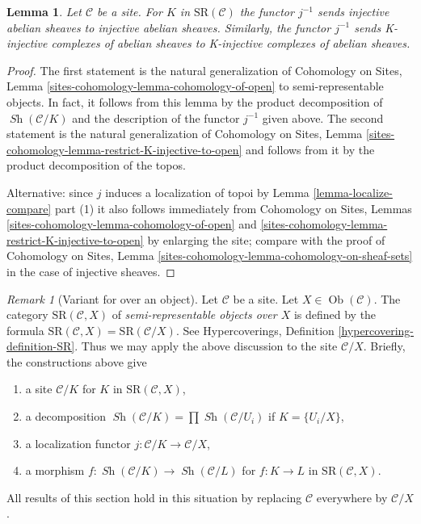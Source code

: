 \documentclass{stacks-project}
\theoremstyle{plain}
\newtheorem{lemma}[subsection]{Lemma}
\theoremstyle{definition}
\theoremstyle{remark}
\newtheorem{remark}[subsection]{Remark}
\numberwithin{equation}{subsection}
\def\Ob{\mathop{\mathrm{Ob}}\nolimits}
\def\Sh{\mathop{\mathit{Sh}}\nolimits}
\begin{document}
\begin{lemma}
\label{lemma-localize-injective}
Let $\mathcal{C}$ be a site. For $K$ in $\text{SR}(\mathcal{C})$
the functor $j^{-1}$ sends injective abelian sheaves to injective
abelian sheaves. Similarly, the functor $j^{-1}$ sends K-injective
complexes of abelian sheaves to K-injective complexes of
abelian sheaves.
\end{lemma}

\begin{proof}
The first statement is the natural generalization of
Cohomology on Sites, Lemma
\ref{sites-cohomology-lemma-cohomology-of-open}
to semi-representable objects.
In fact, it follows from this lemma
by the product decomposition of $\Sh(\mathcal{C}/K)$
and the description of the functor $j^{-1}$ given above.
The second statement is the natural generalization of
Cohomology on Sites, Lemma
\ref{sites-cohomology-lemma-restrict-K-injective-to-open}
and follows from it by the product decomposition of the topos.

\medskip\noindent
Alternative: since $j$ induces a localization of topoi by
Lemma \ref{lemma-localize-compare} part (1)
it also follows immediately from
Cohomology on Sites, Lemmas \ref{sites-cohomology-lemma-cohomology-of-open}
and \ref{sites-cohomology-lemma-restrict-K-injective-to-open}
by enlarging the site; compare with the proof of
Cohomology on Sites, Lemma
\ref{sites-cohomology-lemma-cohomology-on-sheaf-sets}
in the case of injective sheaves.
\end{proof}

\begin{remark}[Variant for over an object]
\label{remark-semi-representable-over-object}
Let $\mathcal{C}$ be a site. Let $X \in \Ob(\mathcal{C})$.
The category $\text{SR}(\mathcal{C}, X)$
of {\it semi-representable objects over $X$}
is defined by the formula
$\text{SR}(\mathcal{C}, X) = \text{SR}(\mathcal{C}/X)$.
See Hypercoverings, Definition \ref{hypercovering-definition-SR}.
Thus we may apply the above discussion to the site
$\mathcal{C}/X$. Briefly, the constructions above give
\begin{enumerate}
\item a site $\mathcal{C}/K$ for $K$ in $\text{SR}(\mathcal{C}, X)$,
\item a decomposition
$\Sh(\mathcal{C}/K) = \prod \Sh(\mathcal{C}/U_i)$ if $K = \{U_i/X\}$,
\item a localization functor $j : \mathcal{C}/K \to \mathcal{C}/X$,
\item a morphism $f : \Sh(\mathcal{C}/K) \to \Sh(\mathcal{C}/L)$
for $f : K \to L$ in $\text{SR}(\mathcal{C}, X)$.
\end{enumerate}
All results of this section hold in this situation by replacing
$\mathcal{C}$ everywhere by $\mathcal{C}/X$.
\end{remark}
\end{document}
